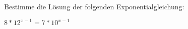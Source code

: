 
Bestimme die Lösung der folgenden Exponentialgleichung:

\begin{math}
	8*12^{x-1} = 7*10^{x-1}
\end{math}